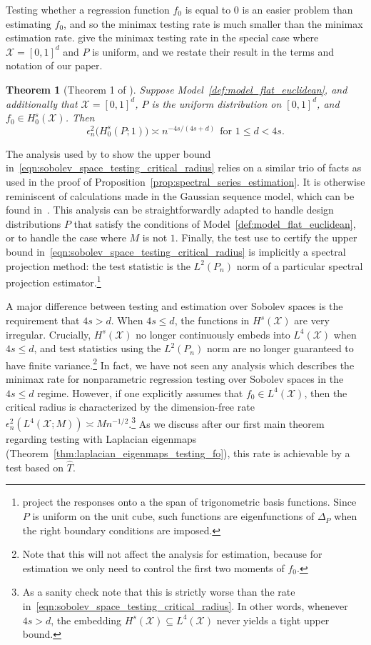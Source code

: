 \documentclass{article}
\newcommand{\1}{\mathbf{1}}
\newcommand{\Xset}{\mathcal{X}}
\newcommand{\Leb}{L}
\newcommand{\mc}[1]{\mathcal{#1}}
\newcommand{\wh}[1]{\widehat{#1}}
\theoremstyle{alden}
\theoremstyle{aldenthm}
\newtheorem{theorem}{Theorem}
\theoremstyle{definition}
\theoremstyle{remark}
\begin{document}
Testing whether a regression function $f_0$ is equal to $0$ is an easier problem than estimating $f_0$, and so the minimax testing rate is much smaller than the minimax estimation rate. \citet{ingster2009} give the minimax testing rate in the special case where $\mc{X} = [0,1]^d$ and $P$ is uniform, and we restate their result in the terms and notation of our paper.
\begin{theorem}[Theorem 1 of \citet{ingster2009}]
	\label{thm:spectral_series_testing}
	Suppose Model~\ref{def:model_flat_euclidean}, and additionally that $\mc{X} = [0,1]^d$, $P$ is the uniform distribution on $[0,1]^d$, and $f_0 \in H_0^s(\mc{X})$. Then 
	\begin{equation}
	\label{eqn:sobolev_space_testing_critical_radius}
	\epsilon_n^2\bigl(H_0^s(P;1)\bigr) \asymp n^{-4s/(4s + d)}~~\textrm{for $1 \leq d < 4s$.}
	\end{equation}
\end{theorem}
The analysis used by \citet{ingster2009} to show the upper bound in~\eqref{eqn:sobolev_space_testing_critical_radius} relies on a similar trio of facts as used in the proof of Proposition~\ref{prop:spectral_series_estimation}. It is otherwise reminiscent of calculations made in the Gaussian sequence model, which can be found in~\cite{ingster2012}. This analysis can be straightforwardly adapted to handle design distributions $P$ that satisfy the conditions of Model~\ref{def:model_flat_euclidean}, or to handle the case where $M$ is not $1$. Finally, the test \citet{ingster2009} use to certify the upper bound in~\eqref{eqn:sobolev_space_testing_critical_radius} is implicitly a spectral projection method: the test statistic is the $L^2(P_n)$ norm of a particular spectral projection estimator.\footnote{\cite{ingster2009} project the responses onto a the span of trigonometric basis functions. Since $P$ is uniform on the unit cube, such functions are eigenfunctions of $\Delta_P$ when the right boundary conditions are imposed.}

A major difference between testing and estimation over Sobolev spaces is the requirement that $4s > d$. When $4s \leq d$, the functions in $H^s(\Xset)$ are very irregular. Crucially, $H^s(\Xset)$ no longer continuously embeds into $\Leb^4(\Xset)$ when $4s \leq d$, and test statistics using the $L^2(P_n)$ norm are no longer guaranteed to have finite variance.\footnote{Note that this will not affect the analysis for estimation, because for estimation we only need to control the first two moments of $f_0$.} In fact, we have not seen any analysis which describes the minimax rate for nonparametric regression testing over Sobolev spaces in the $4s \leq d$ regime. However, if one explicitly assumes that $f_0 \in \Leb^4(\mc{X})$, then the critical radius is characterized by the dimension-free rate $\epsilon_n^2(\Leb^4(\mc{X};M)) \asymp Mn^{-1/2}$.\footnote{As a sanity check note that this is strictly worse than the rate in~\eqref{eqn:sobolev_space_testing_critical_radius}. In other words, whenever $4s > d$, the embedding $H^s(\mc{X}) \subseteq L^4(\mc{X})$ never yields a tight upper bound.} As we discuss after our first main theorem regarding testing with Laplacian eigenmaps (Theorem~\ref{thm:laplacian_eigenmaps_testing_fo}), this rate is achievable by a test based on $\wh{T}$.
\end{document}
